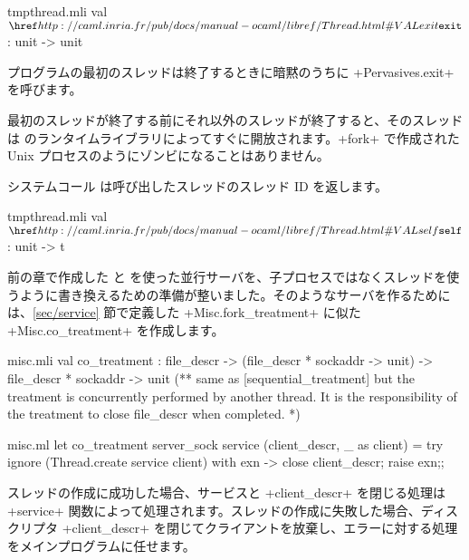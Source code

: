 \begin{listingcodefile}{tmpthread.mli}
val $\indexlibvalue{Thread}{exit}$ : unit -> unit
\end{listingcodefile}
%
プログラムの最初のスレッドは終了するときに暗黙のうちに \ml+Pervasives.exit+ を呼びます。

最初のスレッドが終了する前にそれ以外のスレッドが終了すると、そのスレッドは \ocaml のランタイムライブラリによってすぐに開放されます。\ml+fork+ で作成された Unix プロセスのようにゾンビになることはありません。

システムコール  は呼び出したスレッドのスレッド ID を返します。
\begin{listingcodefile}{tmpthread.mli}
val $\libvalue{Thread}{self}$ : unit -> t
\end{listingcodefile}

前の章で作成した  と  を使った並行サーバを、子プロセスではなくスレッドを使うように書き換えるための準備が整いました。そのようなサーバを作るためには、\ref{sec/service} 節で定義した \ml+Misc.fork_treatment+ に似た \ml+Misc.co_treatment+ を作成します。

%
\begin{codefile}{misc.mli}
val co_treatment :
file_descr -> (file_descr * sockaddr -> unit) ->
file_descr * sockaddr -> unit
(** same as [sequential_treatment] but the treatment is concurrently
 performed by another thread. It is the responsibility of the treatment
 to close file_descr when completed. *)
\end{codefile}
%
\begin{listingcodefile}{misc.ml}
let co_treatment server_sock service (client_descr, _ as client) =
  try ignore (Thread.create service client)
  with exn -> close client_descr; raise exn;;
\end{listingcodefile}
%
スレッドの作成に成功した場合、サービスと \ml+client_descr+ を閉じる処理は \ml+service+ 関数によって処理されます。スレッドの作成に失敗した場合、ディスクリプタ \ml+client_descr+ を閉じてクライアントを放棄し、エラーに対する処理をメインプログラムに任せます。

